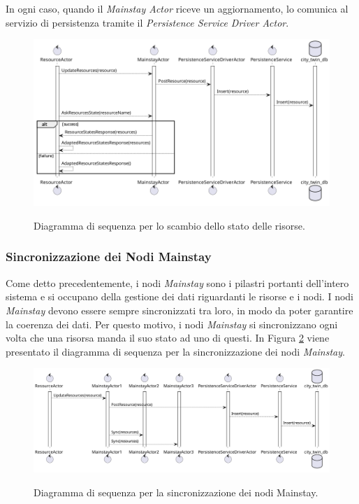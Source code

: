 \documentclass[12pt]{article}
\begin{document}
In ogni caso, quando il \textit{Mainstay Actor} riceve un aggiornamento, lo comunica al servizio di persistenza tramite il \textit{Persistence Service Driver Actor}.

\begin{figure}[H]
    \caption{Diagramma di sequenza per lo scambio dello stato delle risorse.}
    \includegraphics[width=\textwidth]{../assets/images/core-resource-state-exchange-sequence-diagram.png}
    \label{fig:core-resource-state-exchange-sequence-diagram}
\end{figure}

\subsubsection{Sincronizzazione dei Nodi Mainstay}

Come detto precedentemente, i nodi \textit{Mainstay} sono i pilastri portanti dell'intero sistema e si occupano della gestione dei dati riguardanti le risorse e i nodi. I nodi \textit{Mainstay} devono essere sempre sincronizzati tra loro, in modo da poter garantire la coerenza dei dati. Per questo motivo, i nodi \textit{Mainstay} si sincronizzano ogni volta che una risorsa manda il suo stato ad uno di questi. In Figura \ref{fig:core-mainstays-sync-sequence-diagram} viene presentato il diagramma di sequenza per la sincronizzazione dei nodi \textit{Mainstay}.

\begin{figure}[H]
    \caption{Diagramma di sequenza per la sincronizzazione dei nodi Mainstay.}
    \includegraphics[width=\textwidth]{../assets/images/core-mainstays-sync-sequence-diagram.png}
    \label{fig:core-mainstays-sync-sequence-diagram}
\end{figure}
\end{document}
